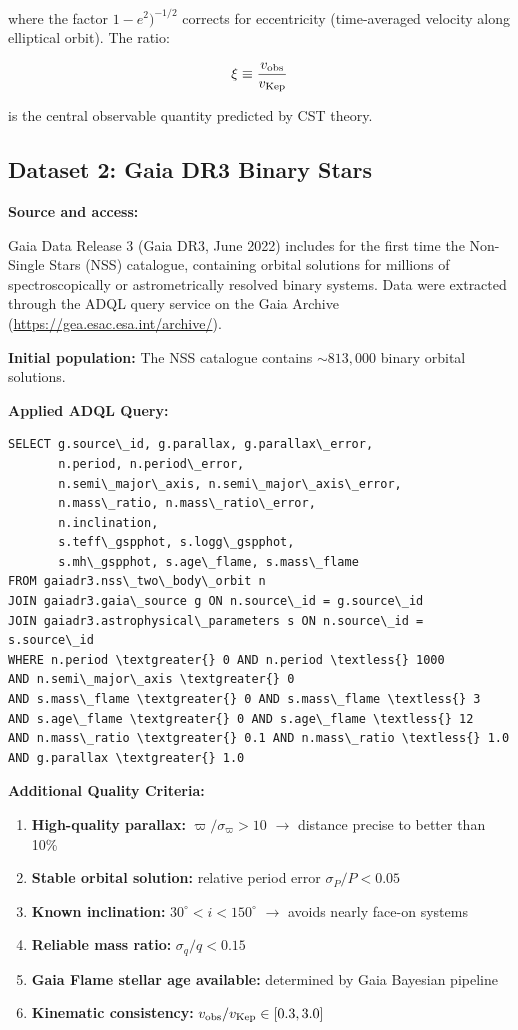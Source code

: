 \documentclass[10pt,a4paper]{article}
\providecommand{\tightlist}{\setlength{\itemsep}{0pt}\setlength{\parskip}{0pt}}
\begin{document}
where the factor \(1-e^2)^{-1/2}\) corrects for eccentricity
(time-averaged velocity along elliptical orbit). The ratio:

\[\xi \equiv \frac{v_{\rm obs}}{v_{\rm Kep}}\]

is the central observable quantity predicted by CST theory.

\subsection{Dataset 2: Gaia DR3 Binary
Stars}\label{dataset-2-gaia-dr3-binary-stars}

\textbf{Source and access:}

Gaia Data Release 3 \cite{GaiaCollaboration2023a} (Gaia DR3, June 2022) includes for the first time
the Non-Single Stars (NSS) catalogue, containing orbital solutions for
millions of spectroscopically or astrometrically resolved binary
systems. Data were extracted through the ADQL query service on the Gaia
Archive (\url{https://gea.esac.esa.int/archive/}).

\textbf{Initial population:} The NSS catalogue contains \(\sim 813,000\)
binary orbital solutions.

\textbf{Applied ADQL Query:}

\begin{lstlisting}
SELECT g.source\_id, g.parallax, g.parallax\_error,
       n.period, n.period\_error,
       n.semi\_major\_axis, n.semi\_major\_axis\_error,
       n.mass\_ratio, n.mass\_ratio\_error,
       n.inclination,
       s.teff\_gspphot, s.logg\_gspphot,
       s.mh\_gspphot, s.age\_flame, s.mass\_flame
FROM gaiadr3.nss\_two\_body\_orbit n
JOIN gaiadr3.gaia\_source g ON n.source\_id = g.source\_id  
JOIN gaiadr3.astrophysical\_parameters s ON n.source\_id = s.source\_id
WHERE n.period \textgreater{} 0 AND n.period \textless{} 1000
AND n.semi\_major\_axis \textgreater{} 0
AND s.mass\_flame \textgreater{} 0 AND s.mass\_flame \textless{} 3
AND s.age\_flame \textgreater{} 0 AND s.age\_flame \textless{} 12
AND n.mass\_ratio \textgreater{} 0.1 AND n.mass\_ratio \textless{} 1.0
AND g.parallax \textgreater{} 1.0
\end{lstlisting}

\textbf{Additional Quality Criteria:}

\begin{enumerate}
\def\labelenumi{\arabic{enumi}.}
\tightlist
\item
  \textbf{High-quality parallax:} \(\varpi/\sigma_\varpi > 10\) $\rightarrow$
  distance precise to better than 10\%
\item
  \textbf{Stable orbital solution:} relative period error
  \(\sigma_P/P < 0.05\)
\item
  \textbf{Known inclination:} \(30^{\circ} < i < 150^{\circ}\) $\rightarrow$ avoids nearly face-on
  systems
\item
  \textbf{Reliable mass ratio:} \(\sigma_q/q < 0.15\)
\item
  \textbf{Gaia Flame stellar age available:} determined by Gaia Bayesian
  pipeline
\item
  \textbf{Kinematic consistency:}
  \(v_{\rm obs}/v_{\rm Kep} \in [0.3, 3.0]\)
\end{enumerate}
\end{document}
